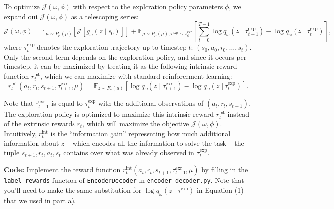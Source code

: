 \item {} To optimize $\mathcal{J}(\omega, \phi)$ with respect to the exploration policy parameters $\phi$, we expand out $\mathcal{J}(\omega, \phi)$ as a telescoping series:
\[
\mathcal{J}(\omega, \phi) = \mathbb{E}_{\mu \sim P_\mu(\mu)}[\mathcal{J}[g_\omega(z \mid s_0)]] + \mathbb{E}_{\mu \sim P_\mu(\mu), \tau^{\text{exp}} \sim \pi_\phi^{\text{exr}}} \left[\sum_{t=0}^{T-1} \log q_\omega(z \mid \tau_{t+1}^{\text{exp}}) - \log q_\omega(z \mid \tau_t^{\text{exp}})\right],
\]
where $\tau_t^{\text{exp}}$ denotes the exploration trajectory up to timestep $t$: $(s_0, a_0, r_0, \ldots, s_t)$. Only the second term depends on the exploration policy, and since it occurs per timestep, it can be maximized by treating it as the following intrinsic reward function $r_t^{\text{int}}$, which we can maximize with standard reinforcement learning:
\begin{equation}
r_t^{\text{int}}(a_t, r_t, s_{t+1}, \tau_{t+1}^{\text{exr}}, \mu) = \mathbb{E}_{z \sim F_\psi(\mu)} \left[\log q_\omega(z \mid \tau_{t+1}^{\text{exr}}) - \log q_\omega(z \mid \tau_t^{\text{exp}})\right].
\end{equation}

Note that $\tau_{t+1}^{\text{exr}}$ is equal to $\tau_t^{\text{exp}}$ with the additional observations of $(a_t, r_t, s_{t+1})$. The exploration policy is optimized to maximize this intrinsic reward $r_t^{\text{int}}$ instead of the extrinsic rewards $r_t$, which will maximize the objective $\mathcal{J}(\omega, \phi)$. Intuitively, $r_t^{\text{int}}$ is the ``information gain'' representing how much additional information about $z$ -- which encodes all the information to solve the task -- the tuple $s_{t+1}, r_t, a_t, s_t$ contains over what was already observed in $\tau_t^{\text{exp}}$.

\textbf{Code:} Implement the reward function $r_t^{\text{int}}(a_t, r_t, s_{t+1}, \tau_{t+1}^{\text{exr}}, \mu)$ by filling in the \texttt{label\_rewards} function of \texttt{EncoderDecoder} in \texttt{encoder\_decoder.py}. Note that you'll need to make the same substitution for $\log q_\omega(z \mid \tau^{\text{exp}})$ in Equation (1) that we used in part a).
